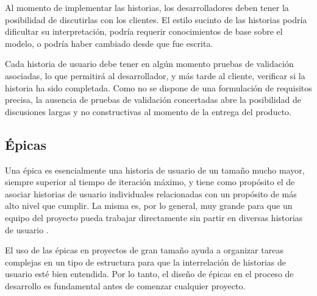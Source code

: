 Al momento de implementar las historias, los desarrolladores deben tener la posibilidad de discutirlas con los clientes. El estilo sucinto de las historias podría dificultar su interpretación, podría requerir conocimientos de base sobre el modelo, o podría haber cambiado desde que fue escrita.

Cada historia de usuario debe tener en algún momento pruebas de validación asociadas, lo que permitirá al desarrollador, y más tarde al cliente, verificar si la historia ha sido completada. Como no se dispone de una formulación de requisitos precisa, la ausencia de pruebas de validación concertadas abre la posibilidad de discusiones largas y no constructivas al momento de la entrega del producto.

\subsection{Épicas}
Una épica es esencialmente una historia de usuario de un tamaño mucho mayor, siempre superior al tiempo de iteración máximo, y tiene como propósito el de asociar historias de usuario individuales relacionadas con un propósito de más alto nivel que cumplir. La misma es, por lo general, muy grande para que un equipo del proyecto pueda trabajar directamente sin partir en diversas historias de usuario \citep{cobb2015project}.

El uso de las épicas en proyectos de gran tamaño ayuda a organizar tareas complejas en un tipo de estructura para que la interrelación de historias de usuario esté bien entendida. Por lo tanto, el diseño de épicas en el proceso de desarrollo es fundamental antes de comenzar cualquier proyecto.